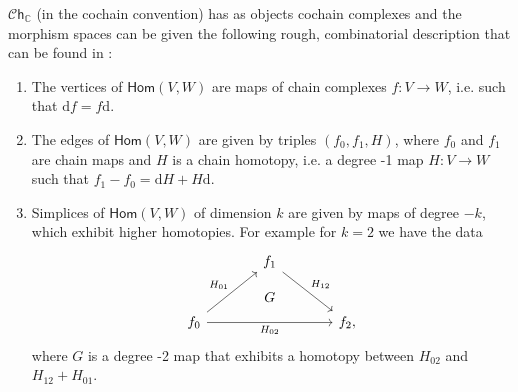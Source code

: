 \documentclass[../text]{subfiles}
\begin{document}
\begin{example}
    $\mathscr{C}\mathsf{h}_{\mathbb{C}}$ (in the cochain convention) has as objects cochain complexes and the morphism spaces can be given the following rough, combinatorial description that can be found in \cite{tanaka20}:
    \begin{enumerate}
        \item The vertices of $\mathsf{Hom}(V, W)$ are maps of chain complexes $f: V \rightarrow W$, i.e. such that $\mathrm{d} f = f \mathrm{d}$.
        \item The edges of $\mathsf{Hom}(V, W)$ are given by triples $(f_0, f_1, H)$, where $f_0$ and $f_1$ are chain maps and $H$ is a chain homotopy, i.e. a degree -1 map $H: V \rightarrow W$ such that $f_1 - f_0 = \mathrm{d} H + H \mathrm{d}$.
        \item Simplices of $\mathsf{Hom}(V, W)$ of dimension $k$ are given by maps of degree $-k$, which exhibit higher homotopies. For example for $k=2$ we have the data
        \begin{equation}
            \begin{tikzcd}[row sep = large, column sep = large]
                & f_1 \arrow[rd, "H_{12}"] \arrow[d, phantom, "G"] & \\
                f_0 \arrow[ru, "H_{01}"] \arrow[rr, "H_{02}"'] & {} & f_2,
            \end{tikzcd}
        \end{equation}
        where $G$ is a degree -2 map that exhibits a homotopy between $H_{02}$ and $H_{12} + H_{01}$.
    \end{enumerate}
\end{example}
\end{document}
